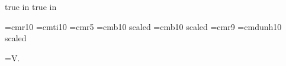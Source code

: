  true in
 true in





\font\dotless=cmr10 %
\font\itdotless=cmti10
\def\itumi{{\"{\itdotless\char'020}}}
\def\itumj{{\"{\itdotless\char'021}}}
\def\umi{{\"{\dotless\char'020}}}
\def\umj{{\"{\dotless\char'021}}}
\font\smaller=cmr5
\font\boldtitlefont=cmb10 scaled
\font\smallboldtitle=cmb10 scaled 
\font\ninerm=cmr9
\font\dun=cmdunh10 scaled

\footline={\hfil {\tenrm V.\folio}\hfil}

\def\eps{{\varepsilon}}
\def\Eps{{\epsilon}}
\def\kap{{\kappa}}
\def\lam{{\lambda}}
\def\Lam{{\Lambda}}
\def\mynabla{{\nabla\!}}

\def\undertext#1{$\underline{\vphantom{y}\hbox{#1}}$}
\def\nspace{\lineskip=1pt\baselineskip=12pt%
     \lineskiplimit=0pt}
\def\dspace{\lineskip=2pt\baselineskip=18pt%
     \lineskiplimit=0pt}

\def\half{{\textstyle 1\over\textstyle 2}}
\def\w{{\mathchoice{\,{\scriptstyle\wedge}\,}
  {{\scriptstyle\wedge}}
  {{\scriptscriptstyle\wedge}}{{\scriptscriptstyle\wedge}}}}
\def\Le{{\mathchoice{\,{\scriptstyle\le}\,}
{\,{\scriptstyle\le}\,}
{\,{\scriptscriptstyle\le}\,}{\,{\scriptscriptstyle\le}\,}}}
\def\Ge{{\mathchoice{\,{\scriptstyle\ge}\,}
{\,{\scriptstyle\ge}\,}
{\,{\scriptscriptstyle\ge}\,}{\,{\scriptscriptstyle\ge}\,}}}
\def\plus{{\hbox{$\scriptscriptstyle +$}}}
\def\xdot{\dot{x}}
\def\Condition#1{\item{#1}}
\def\Firstcondition#1{\hangindent\parindent{#1}\enspace
     \ignorespaces}
\def\Proclaim#1{\medbreak
  \medskip\noindent{\bf#1\enspace}\it\ignorespaces}
\def\finishproclaim{\par\rm
     \ifdim\lastskip<\medskipamount\removelastskip
     \penalty55\medskip\fi}
\def\Item#1{\par\smallskip\hang\indent%
  \llap{\hbox to\parindent {#1\hfill\enspace}}\ignorespaces}

\def\im{{\rm Im}}  
\def\Pic{{\rm Pic}} \def\Sp{{\rm Sp}}
\def\Diff{{\rm Diff}}  
\def\Map{{\rm Map}}  
\def\spurious{{\rm spurious}}
\def\Tr{{\rm Tr\,}}
\def\SL{{\rm SL}} \def\prim{{\rm primitive}}
\def\Det{{\rm Det}} 
\def\Weil-Peterson{{\rm Weil-Peterson}}

